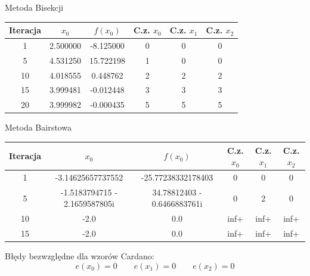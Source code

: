 \documentclass[a4paper]{article}
\begin{document}
    \vspace{5mm}

    \begin{center}
        Metoda Bisekcji
    \end{center}
    \begin{center}
        \begin{tabular}{|c|c|c|c|c|c|} 
            \hline
            Iteracja & $x_0$ & $f(x_0)$ & C.z. $x_0$ & C.z. $x_1$ & C.z. $x_2$ \\
            \hline
            1 & 2.500000 & -8.125000 & 0 & 0 & 0 \\
            \hline
            5 & 4.531250 & 15.722198 & 1 & 0 & 0 \\
            \hline
            10 & 4.018555 & 0.448762 & 2 & 2 & 2 \\
            \hline
            15 & 3.999481 & -0.012448 & 3 & 3 & 3 \\
            \hline
            20 & 3.999982 & -0.000435 & 5 & 5 & 5 \\
            \hline
        \end{tabular}
    \end{center}
    
    \vspace{5mm}

    \begin{center}
        Metoda Bairstowa
    \end{center}
    \begin{center}
        \begin{tabular}{|c|c|c|c|c|c|} 
            \hline
            Iteracja & $x_0$ & $f(x_0)$ & C.z. $x_0$ & C.z. $x_1$ & C.z. $x_2$ \\
            \hline
            1 & -3.14625657737552 & -25.77238332178403 & 0 & 0 & 0 \\ 
            \hline
            5 & -1.5183794715 - 2.1659587805i & 34.78812403 - 0.6466883761i & 0 & 2 & 0 \\ 
            \hline
            10 & -2.0 & 0.0 & inf+ & inf+ & inf+ \\
            \hline
            15 & -2.0 & 0.0 & inf+ & inf+ & inf+ \\
            \hline
        \end{tabular}
    \end{center}

    \vspace{5mm}

    \begin{center}
        Błędy bezwzględne dla wzorów Cardano:
        \[
            e(x_0) = 0 \qquad e(x_1) = 0 \qquad e(x_2) = 0  
        \]
    \end{center}
\end{document}
